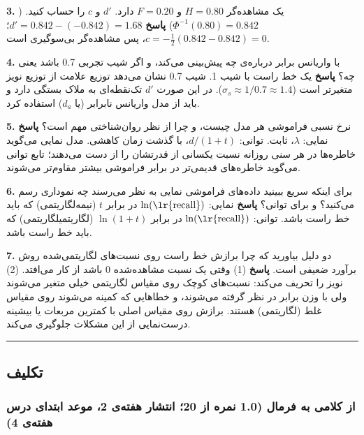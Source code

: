 \textbf{3.} یک مشاهده‌گر \(H = 0.80\) و \(F = 0.20\) دارد. \(d'\) و \(c\)
را حساب کنید. (\(\Phi^{-1}(0.80) = 0.842\)) \textbf{پاسخ}
\(d' = 0.842 - (-0.842) = 1.68\)؛
\(c = -\tfrac{1}{2}(0.842 - 0.842) = 0\)، پس مشاهده‌گر بی‌سوگیری است.

\textbf{4.}  با واریانس برابر درباره‌ی  چه پیش‌بینی
می‌کند، و اگر شیب تجربی 0.7 باشد یعنی چه؟ \textbf{پاسخ} یک خط راست با شیب
1. شیب 0.7 نشان می‌دهد توزیع علامت از توزیع نویز متغیرتر است
(\(\sigma_s \approx 1/0.7 \approx 1.4\)). در این صورت \(d'\) تک‌نقطه‌ای به
ملاک بستگی دارد و باید از مدل واریانس نابرابر (یا \(d_a\)) استفاده کرد.

\textbf{5.} نرخ نسبی فراموشی هر مدل چیست، و چرا از نظر روان‌شناختی مهم
است؟ \textbf{پاسخ} نمایی: \(\lambda\)، ثابت. توانی: \(d/(1+t)\)، با گذشت
زمان کاهشی. مدل نمایی می‌گوید خاطره‌ها در هر سنی روزانه نسبت یکسانی از
قدرتشان را از دست می‌دهند؛ تابع توانی می‌گوید خاطره‌های قدیمی‌تر در برابر
فراموشی بیشتر مقاوم‌تر می‌شوند.

\textbf{6.} برای اینکه سریع ببینید داده‌های فراموشی نمایی به نظر می‌رسند
چه نموداری رسم می‌کنید؟ و برای توانی؟ \textbf{پاسخ} نمایی:
\(\ln(\text{\lr{recall}})\) در برابر \(t\) (نیمه‌لگاریتمی) که باید خط راست
باشد. توانی: \(\ln(\text{\lr{recall}})\) در برابر \(\ln(1+t)\)
(لگاریتمی\lr{--}لگاریتمی) که باید خط راست باشد.

\textbf{7.} دو دلیل بیاورید که چرا برازش خط راست روی نسبت‌های لگاریتمی‌شده
روش برآورد ضعیفی است. \textbf{پاسخ} (1) وقتی یک نسبت مشاهده‌شده 0 باشد از
کار می‌افتد. (2) نویز را تحریف می‌کند: نسبت‌های کوچک روی مقیاس لگاریتمی
خیلی متغیر می‌شوند ولی با وزن برابر در نظر گرفته می‌شوند، و خطاهایی که
کمینه می‌شوند روی مقیاس غلط (لگاریتمی) هستند. برازش روی مقیاس اصلی با
کمترین مربعات یا بیشینه درست‌نمایی از این مشکلات جلوگیری می‌کند.

\begin{center}\rule{0.5\linewidth}{0.5pt}\end{center}


\subsection{تکلیف}

\subsubsection{\texorpdfstring{ از کلامی به فرمال (1.0 نمره از
20؛ انتشار هفته‌ی 2، موعد ابتدای درس هفته‌ی
4)}{A1: از کلامی به فرمال (1.0 نمره از 20؛ انتشار هفته‌ی 2، موعد ابتدای درس هفته‌ی 4)}}

